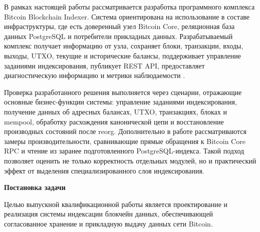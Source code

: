 В рамках настоящей работы рассматривается разработка программного комплекса
Bitcoin Blockchain Indexer. Система ориентирована на использование в составе
инфраструктуры, где есть доверенный узел Bitcoin Core, реляционная база данных
PostgreSQL и потребители прикладных данных. Разрабатываемый комплекс получает
информацию от узла, сохраняет блоки, транзакции, входы, выходы, UTXO, текущие
и исторические балансы, поддерживает управление заданиями индексирования,
публикует REST API, предоставляет диагностическую информацию и метрики
наблюдаемости \cite{postgres_docs, prometheus_docs}.

Проверка разработанного решения выполняется через сценарии, отражающие основные
бизнес-функции системы: управление заданиями индексирования, получение данных
об адресных балансах, UTXO, транзакциях, блоках и mempool, обработку
расхождения канонической цепи и восстановление производных состояний после
reorg. Дополнительно в работе рассматриваются замеры производительности,
сравнивающие прямые обращения к Bitcoin Core RPC и чтение из заранее
подготовленного PostgreSQL-индекса. Такой подход позволяет оценить не только
корректность отдельных модулей, но и практический эффект от выделения
специализированного слоя индексирования.

\textbf{Постановка задачи}

Целью выпускной квалификационной работы является проектирование и реализация
системы индексации блокчейн данных, обеспечивающей согласованное хранение и
прикладную выдачу данных сети Bitcoin.

